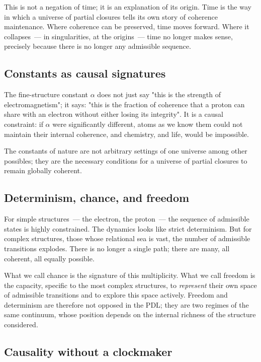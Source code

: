 \documentclass[12pt, a4paper, openright]{book}
\begin{document}
This is not a negation of time; it is an explanation of its origin. Time is the way in which a universe of partial closures tells its own story of coherence maintenance. Where coherence can be preserved, time moves forward. Where it collapses~--- in singularities, at the origins~--- time no longer makes sense, precisely because there is no longer any admissible sequence.

\subsection*{Constants as causal signatures}

The fine-structure constant $\alpha$ does not just say "this is the strength of electromagnetism"; it says: "this is the fraction of coherence that a proton can share with an electron without either losing its integrity". It is a causal constraint: if $\alpha$ were significantly different, atoms as we know them could not maintain their internal coherence, and chemistry, and life, would be impossible.

\medskip

The constants of nature are not arbitrary settings of one universe among other possibles; they are the necessary conditions for a universe of partial closures to remain globally coherent.

\subsection*{Determinism, chance, and freedom}

For simple structures~--- the electron, the proton~--- the sequence of admissible states is highly constrained. The dynamics looks like strict determinism. But for complex structures, those whose relational sea is vast, the number of admissible transitions explodes. There is no longer a single path; there are many, all coherent, all equally possible.

\medskip

What we call chance is the signature of this multiplicity. What we call freedom is the capacity, specific to the most complex structures, to \emph{represent} their own space of admissible transitions and to explore this space actively. Freedom and determinism are therefore not opposed in the PDL; they are two regimes of the same continuum, whose position depends on the internal richness of the structure considered.

\subsection*{Causality without a clockmaker}
\end{document}
